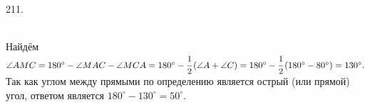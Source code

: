 211. \begin{figure}[ht!]
\end{figure}\\
Найдём $\angle AMC=180^\circ-\angle MAC-\angle MCA=180^\circ-\cfrac{1}{2}\left(\angle A +\angle C\right)=180^\circ-\cfrac{1}{2}\left(180^\circ-80^\circ\right)=130^\circ.$ Так как углом между прямыми по определению является острый (или прямой) угол, ответом является $180^\circ-130^\circ=50^\circ.$
\newpage\noindent
